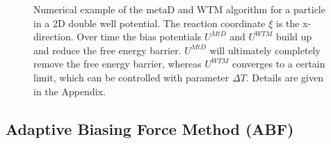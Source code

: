 \begin{figure}[H]
    \centering
    \caption{Numerical example of the metaD and WTM algorithm for a particle in a 2D double well potential. The reaction coordinate $\xi$ is the x-direction. Over time the bias potentials $U^{MtD}$ and $U^{WTM}$ build up and reduce the free energy barrier. $U^{MtD}$ will ultimately completely remove the free energy barrier, whereas $U^{WTM}$ converges to a certain limit, which can be controlled with parameter $\Delta T$. Details are given in the Appendix.}
\label{fig:metaD}%
\end{figure}

\newpage
\subsection{Adaptive Biasing Force Method (ABF)}
\label{sec:ABF}

